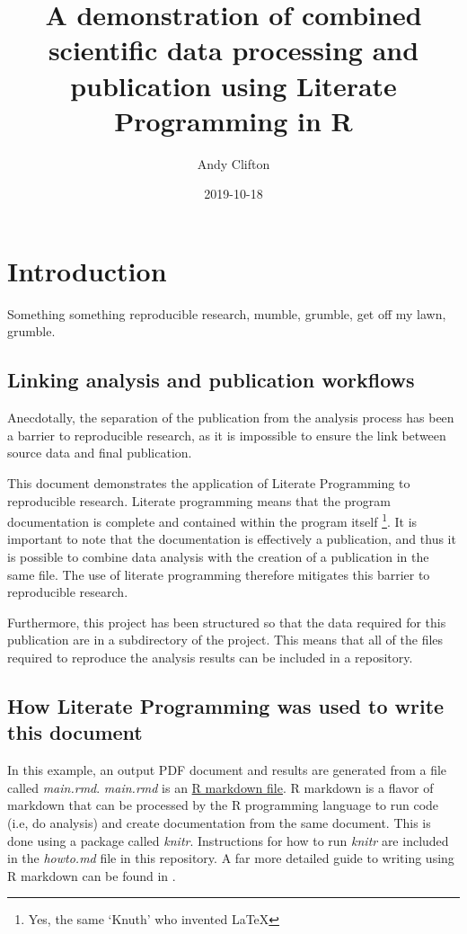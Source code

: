 \documentclass[11pt,]{article}
\title{A demonstration of combined scientific data processing and publication using Literate Programming in R}
\author{Andy Clifton}
\date{2019-10-18}
\let\rmarkdownfootnote\footnote%
\def\footnote{\protect\rmarkdownfootnote}
\begin{document}
\maketitle

{
\hypersetup{linkcolor=black}
\setcounter{tocdepth}{2}
\tableofcontents
}
\hypertarget{introduction}{%
\section{Introduction}\label{introduction}}

Something something reproducible research, mumble, grumble, get off my lawn, grumble.

\hypertarget{linking-analysis-and-publication-workflows}{%
\subsection{Linking analysis and publication workflows}\label{linking-analysis-and-publication-workflows}}

Anecdotally, the separation of the publication from the analysis process has been a barrier to reproducible research, as it is impossible to ensure the link between source data and final publication.

This document demonstrates the application of Literate Programming to reproducible research. Literate programming means that the program documentation is complete and contained within the program itself \citep{Knuth1984}\footnote{Yes, the same `Knuth' who invented LaTeX}. It is important to note that the documentation is effectively a publication, and thus it is possible to combine data analysis with the creation of a publication in the same file. The use of literate programming therefore mitigates this barrier to reproducible research.

Furthermore, this project has been structured so that the data required for this publication are in a subdirectory of the project. This means that all of the files required to reproduce the analysis results can be included in a repository.

\hypertarget{how-literate-programming-was-used-to-write-this-document}{%
\subsection{How Literate Programming was used to write this document}\label{how-literate-programming-was-used-to-write-this-document}}

In this example, an output PDF document and results are generated from a file called \emph{main.rmd}. \emph{main.rmd} is an \href{https://rmarkdown.rstudio.com/authoring_basics.html}{R markdown file}. R markdown is a flavor of markdown that can be processed by the R programming language \citep{R-base} to run code (i.e, do analysis) and create documentation from the same document. This is done using a package called \emph{knitr}. Instructions for how to run \emph{knitr} are included in the \emph{howto.md} file in this repository. A far more detailed guide to writing using R markdown can be found in \citet{R-Markdown-Guide}.
\end{document}
